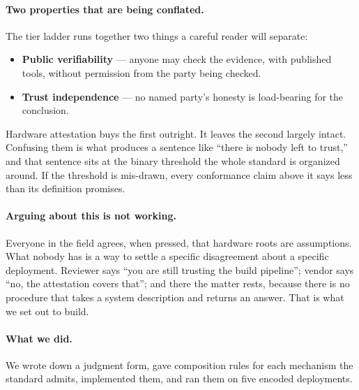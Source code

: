 \documentclass[11pt]{article}
\begin{document}
\paragraph{Two properties that are being conflated.} The tier ladder runs
together two things a careful reader will separate:

\begin{itemize}[itemsep=1pt,topsep=2pt]
\item \textbf{Public verifiability} --- anyone may check the evidence, with
published tools, without permission from the party being checked.
\item \textbf{Trust independence} --- no named party's honesty is
load-bearing for the conclusion.
\end{itemize}

Hardware attestation buys the first outright. It leaves the second largely
intact. Confusing them is what produces a sentence like ``there is nobody
left to trust,'' and that sentence sits at the binary threshold the whole
standard is organized around. If the threshold is mis-drawn, every
conformance claim above it says less than its definition promises.

\paragraph{Arguing about this is not working.} Everyone in the field agrees,
when pressed, that hardware roots are assumptions. What nobody has is a way to
settle a specific disagreement about a specific deployment. Reviewer says
``you are still trusting the build pipeline''; vendor says ``no, the
attestation covers that''; and there the matter rests, because there is no
procedure that takes a system description and returns an answer. That is what
we set out to build.

\paragraph{What we did.} We wrote down a judgment form, gave composition rules
for each mechanism the standard admits, implemented them, and ran them on
five encoded deployments.
\end{document}
